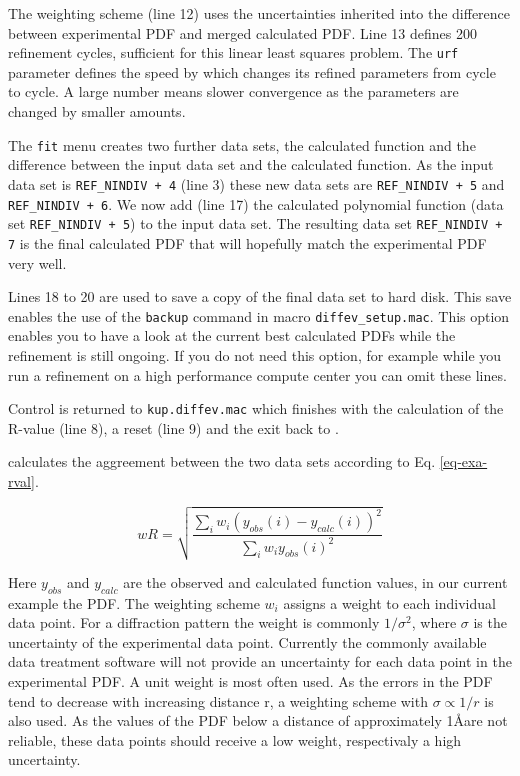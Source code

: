 The weighting scheme (line 12) uses the uncertainties inherited into the 
difference between experimental PDF and merged calculated PDF. Line 13
defines 200 refinement cycles, sufficient for this linear least squares 
problem. The {\tt urf} parameter defines the speed by which \Kuplot 
changes its refined parameters from cycle to cycle. A large number means slower
convergence as the parameters are changed by smaller amounts.

The {\tt fit} menu creates two further data sets, the calculated function
and the difference between the input data set and the calculated function.
As the input data set is {\tt REF\_NINDIV + 4} (line 3) these new data sets are
{\tt REF\_NINDIV + 5}  and {\tt REF\_NINDIV + 6}. We now add (line 17) 
the calculated polynomial function (data set {\tt REF\_NINDIV + 5}) 
to the input data set. The resulting data set {\tt REF\_NINDIV + 7} 
is the final calculated PDF that will hopefully match the experimental
PDF very well.

Lines 18 to 20 are used to save a copy of the final data set to hard disk.
This save enables the use of the {\tt backup} command in 
macro {\tt diffev\_setup.mac}. This option enables you to have a look 
at the current best calculated PDFs while the refinement is still ongoing.
If you do not need this option, for example while you run a refinement
on a high performance compute center you can omit these lines.

Control is returned to {\tt kup.diffev.mac} which finishes with the
calculation of the R-value (line 8), a reset (line 9) and the exit 
back to \Discus.

\Kuplot calculates the aggreement between the two data sets according
to Eq. \ref{eq-exa-rval}.

\begin{equation}
   wR = \sqrt{\frac{\sum_{i} w_{i} (y_{obs}(i) - y_{calc}(i))^2}
                   {\sum_{i} w_{i} y_{obs}(i)^2}}
  \label{eq-exa-rval}
\end{equation}

Here $y_{obs}$ and $y_{calc}$ are the observed and calculated function
values, in our current example the PDF. The weighting scheme $w_{i}$
assigns a weight to each individual data point. For a diffraction
pattern the weight is commonly $1/\sigma^2$, where $\sigma$ is the
uncertainty of the experimental data point. Currently the commonly
available data treatment software will not provide an uncertainty 
for each data point in the experimental PDF. A unit weight is 
most often used. As the errors in the PDF tend to decrease with 
increasing distance r, a weighting scheme with $\sigma \propto 1/r$
is also used. As the values of the PDF below a distance of 
approximately 1\AA are not reliable, these data points should 
receive a low weight, respectivaly a high uncertainty.

